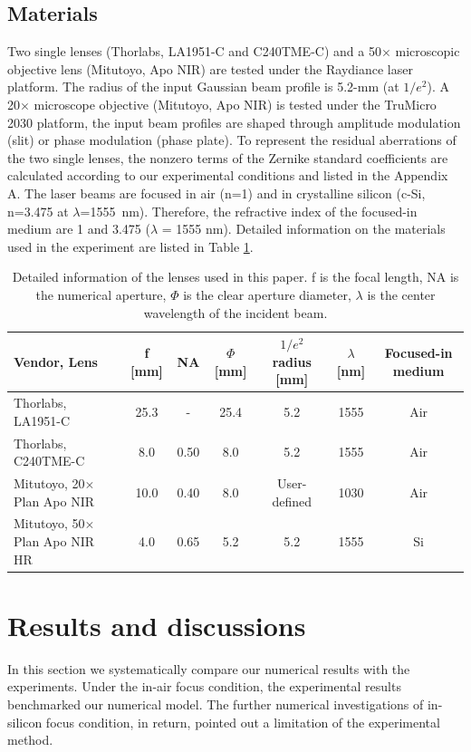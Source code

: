 \documentclass[9pt,twocolumn,twoside]{osajnl}
\begin{document}
\subsection{Materials}
Two single lenses (Thorlabs, LA1951-C and C240TME-C) and a 50$\times$ microscopic objective lens (Mitutoyo, Apo NIR) are tested under the Raydiance laser platform. The radius of the input Gaussian beam profile is 5.2-mm (at $1/e^2$). A 20$\times$ microscope objective (Mitutoyo, Apo NIR) is tested under the TruMicro 2030 platform, the input beam profiles are shaped through amplitude modulation (slit) or phase modulation (phase plate). To represent the residual aberrations of the two single lenses, the nonzero terms of the Zernike standard coefficients are calculated according to our experimental conditions and listed in the Appendix A. The laser beams are focused in air (n=1) and in crystalline silicon (c-Si, n=3.475 at $\lambda$=1555~nm). Therefore, the refractive index of the focused-in medium are 1 and 3.475 ($\lambda$ = 1555 nm). Detailed information on the materials used in the experiment are listed in Table \ref{tab:1}.
\begin{table}
	\centering
	\begin{tabular}[c]{|l|c|c|c|c|c|c|}
		\hline
		\rowcolor{gray}
		Vendor, Lens& f [mm]& NA & $\Phi$ [mm] & $1/e^2$ radius [mm] & $\lambda$ [nm]& Focused-in medium\\
		\hline
		Thorlabs, LA1951-C & 25.3 & - & 25.4 & 5.2 & 1555 & Air \\
		\rowcolor{lightgray}
		Thorlabs, C240TME-C & 8.0 & 0.50 & 8.0 & 5.2 & 1555 & Air\\
		Mitutoyo, 20$\times$ Plan Apo NIR & 10.0 & 0.40 & 8.0 & User-defined & 1030 & Air\\
		\rowcolor{lightgray}
		Mitutoyo, 50$\times$ Plan Apo NIR HR & 4.0 & 0.65 & 5.2 & 5.2 & 1555 & Si\\
		\hline
	\end{tabular}	
	\caption{Detailed information of the lenses used in this paper. f is the focal length, NA is the numerical aperture, $\Phi$ is the clear aperture diameter, $\lambda$ is the center wavelength of the incident beam.}\label{tab:1}
\end{table}

\section{Results and discussions} \label{section:3}
In this section we systematically compare our numerical results with the experiments. Under the in-air focus condition, the experimental results benchmarked our numerical model. The further numerical investigations of in-silicon focus condition, in return, pointed out a limitation of the experimental method.
\end{document}
